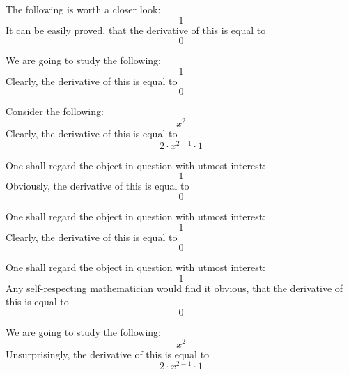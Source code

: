 \documentclass{article}
\begin{document}
The following is worth a closer look:
\begin{equation}
1 
\end{equation}
It can be easily proved, that the derivative of this is equal to
\begin{equation}
0 
\end{equation}

We are going to study the following:
\begin{equation}
1 
\end{equation}
Clearly, the derivative of this is equal to
\begin{equation}
0 
\end{equation}

Consider the following:
\begin{equation}
x ^{2 } 
\end{equation}
Clearly, the derivative of this is equal to
\begin{equation}
2 \cdot x ^{2 - 1 } \cdot 1 
\end{equation}

One shall regard the object in question with utmost interest:
\begin{equation}
1 
\end{equation}
Obviously, the derivative of this is equal to
\begin{equation}
0 
\end{equation}

One shall regard the object in question with utmost interest:
\begin{equation}
1 
\end{equation}
Clearly, the derivative of this is equal to
\begin{equation}
0 
\end{equation}

One shall regard the object in question with utmost interest:
\begin{equation}
1 
\end{equation}
Any self-respecting mathematician would find it obvious, that the derivative of this is equal to
\begin{equation}
0 
\end{equation}

We are going to study the following:
\begin{equation}
x ^{2 } 
\end{equation}
Unsurprisingly, the derivative of this is equal to
\begin{equation}
2 \cdot x ^{2 - 1 } \cdot 1 
\end{equation}
\end{document}
